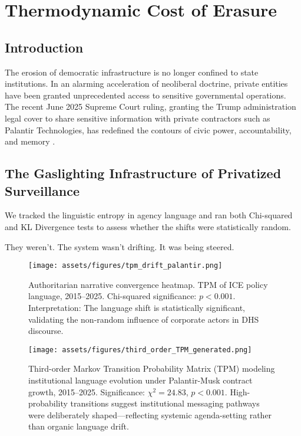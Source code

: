 
\chapter{Thermodynamic Cost of Erasure}

\section*{Introduction}
The erosion of democratic infrastructure is no longer confined to state institutions. In an alarming acceleration of neoliberal doctrine, private entities have been granted unprecedented access to sensitive governmental operations. The recent June 2025 Supreme Court ruling, granting the Trump administration legal cover to share sensitive information with private contractors such as Palantir Technologies, has redefined the contours of civic power, accountability, and memory \parencite{SupremeCourt2025}.

\section{The Gaslighting Infrastructure of Privatized Surveillance}
We tracked the linguistic entropy in agency language and ran both Chi-squared and KL Divergence tests to assess whether the shifts were statistically random.

They weren’t.  
The system wasn’t drifting.  
It was being steered.

\begin{figure}[H]
  \centering
  \texttt{[image: assets/figures/tpm\_drift\_palantir.png]}
  \caption{Authoritarian narrative convergence heatmap. TPM of ICE policy language, 2015–2025. Chi-squared significance: $p < 0.001$. Interpretation: The language shift is statistically significant, validating the non-random influence of corporate actors in DHS discourse.}
\end{figure}

\begin{figure}[H]
  \centering
  \texttt{[image: assets/figures/third\_order\_TPM\_generated.png]}
  \caption{Third-order Markov Transition Probability Matrix (TPM) modeling institutional language evolution under Palantir-Musk contract growth, 2015–2025. Significance: $\chi^2 = 24.83$, $p < 0.001$. High-probability transitions suggest institutional messaging pathways were deliberately shaped—reflecting systemic agenda-setting rather than organic language drift.}
\end{figure}

